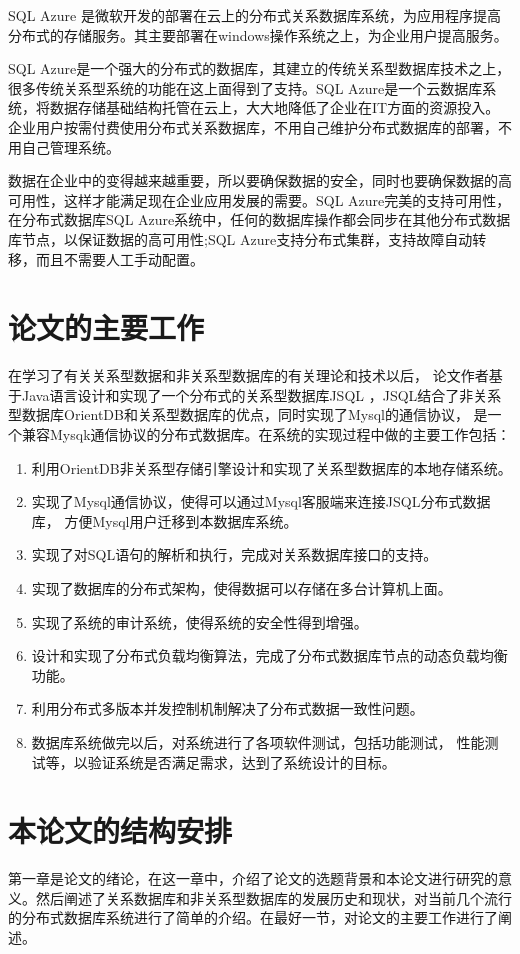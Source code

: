 	
	SQL Azure 是微软开发的部署在云上的分布式关系数据库系统，为应用程序提高分布式的存储服务。其主要部署在windows操作系统之上，为企业用户提高服务。
	
	SQL Azure是一个强大的分布式的数据库，其建立的传统关系型数据库技术之上，很多传统关系型系统的功能在这上面得到了支持。SQL Azure是一个云数据库系统，将数据存储基础结构托管在云上，大大地降低了企业在IT方面的资源投入。企业用户按需付费使用分布式关系数据库，不用自己维护分布式数据库的部署，不用自己管理系统。
	
	数据在企业中的变得越来越重要，所以要确保数据的安全，同时也要确保数据的高可用性，这样才能满足现在企业应用发展的需要。SQL Azure完美的支持可用性，在分布式数据库SQL Azure系统中，任何的数据库操作都会同步在其他分布式数据库节点，以保证数据的高可用性;SQL Azure支持分布式集群，支持故障自动转移，而且不需要人工手动配置。
\section{论文的主要工作}
在学习了有关关系型数据和非关系型数据库的有关理论和技术以后，
论文作者基于Java语言设计和实现了一个分布式的关系型数据库JSQL
，JSQL结合了非关系型数据库OrientDB和关系型数据库的优点，同时实现了Mysql的通信协议，
是一个兼容Mysqk通信协议的分布式数据库。在系统的实现过程中做的主要工作包括：
\begin{enumerate}[fullwidth,itemindent=2em]
	\item 利用OrientDB非关系型存储引擎设计和实现了关系型数据库的本地存储系统。
	\item 实现了Mysql通信协议，使得可以通过Mysql客服端来连接JSQL分布式数据库，
	方便Mysql用户迁移到本数据库系统。
	\item 实现了对SQL语句的解析和执行，完成对关系数据库接口的支持。
	\item 实现了数据库的分布式架构，使得数据可以存储在多台计算机上面。
	\item 实现了系统的审计系统，使得系统的安全性得到增强。
	\item 设计和实现了分布式负载均衡算法，完成了分布式数据库节点的动态负载均衡功能。
	\item 利用分布式多版本并发控制机制解决了分布式数据一致性问题。
	\item 数据库系统做完以后，对系统进行了各项软件测试，包括功能测试，
	性能测试等，以验证系统是否满足需求，达到了系统设计的目标。
\end{enumerate}
\section{本论文的结构安排}
第一章是论文的绪论，在这一章中，介绍了论文的选题背景和本论文进行研究的意
义。然后阐述了关系数据库和非关系型数据库的发展历史和现状，对当前几个流行的分布式数据库系统进行了简单的介绍。在最好一节，对论文的主要工作进行了阐述。

